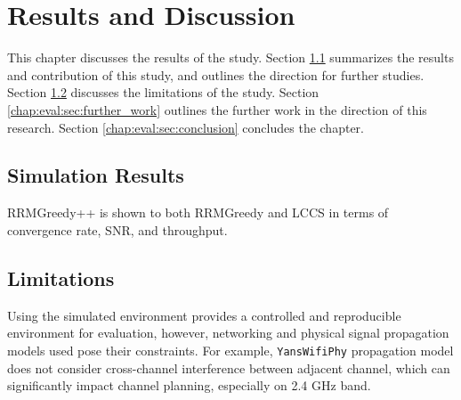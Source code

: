 \chapter{Results and Discussion}
\label{chap:eval}

This chapter discusses the results of the study.
Section \ref{chap:eval:sec:results} summarizes the results and contribution of this study, and outlines the direction for further studies. Section \ref{chap:eval:sec:limitations} discusses the limitations of the study. Section \ref{chap:eval:sec:further_work} outlines the further work in the direction of this research. Section \ref{chap:eval:sec:conclusion} concludes the chapter.

\section{Simulation Results}
\label{chap:eval:sec:results}
RRMGreedy++ is shown to both RRMGreedy and LCCS in terms of convergence rate, SNR, and throughput.

\section{Limitations}
\label{chap:eval:sec:limitations}

Using the simulated environment provides a controlled and reproducible environment for evaluation, however, networking and physical signal propagation models used pose their constraints. For example, \texttt{YansWifiPhy} propagation model does not consider cross-channel interference between adjacent channel, which can significantly impact channel planning, especially on 2.4 GHz band.

